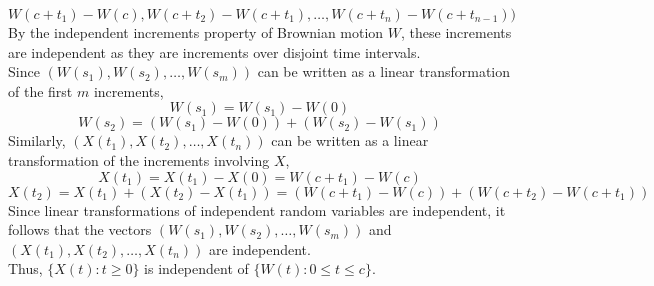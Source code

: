 \documentclass{article}
\begin{document}
{$$W(c + t_1) - W(c), W(c + t_2) - W(c + t_1), \ldots, W(c + t_n) - W(c + t_{n-1}))$$
By the independent increments property of Brownian motion $W$, these increments are independent as they are increments over disjoint time intervals. \\
Since $(W(s_1), W(s_2), \ldots, W(s_m))$ can be written as a linear transformation of the first $m$ increments,
$$W(s_1) = W(s_1) - W(0)$$
$$W(s_2) = (W(s_1) - W(0)) + (W(s_2) - W(s_1)) $$
Similarly, $(X(t_1), X(t_2), \ldots, X(t_n))$ can be written as a linear transformation of the increments involving $X$,
$$X(t_1) = X(t_1) - X(0) = W(c + t_1) - W(c) $$
$$X(t_2) = X(t_1) + (X(t_2) - X(t_1)) = (W(c + t_1) - W(c)) + (W(c + t_2) - W(c + t_1)) $$
Since linear transformations of independent random variables are independent, it follows that the vectors $(W(s_1), W(s_2), \ldots, W(s_m))$ and $(X(t_1), X(t_2), \ldots, X(t_n))$ are independent. \\
Thus, $\{X(t) : t \geq 0\}$ is independent of $\{W(t) : 0 \leq t \leq c\}$.
}
\end{document}
